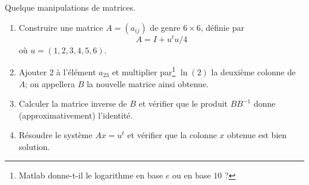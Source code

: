 \begin{exercice}\label{exoSC_serie1-0003}

	Quelque manipulations de matrices.

	\begin{enumerate}

		\item			
			Construire une matrice $A=(a_{ij})$ de genre $6\times 6$, définie par
			\begin{equation}
				A=I+u^tu/4
			\end{equation}
			où $u=(1,2,3,4,5,6)$.
		\item
			Ajouter $2$ à l'élément $a_{23}$ et multiplier par\footnote{Matlab donne-t-il le logarithme en base $e$ ou en base $10$ ?} $\ln(2)$ la deuxième colonne de $A$; on appellera $B$ la nouvelle matrice ainsi obtenue.
		\item
			Calculer la matrice inverse de $B$ et vérifier que le produit $BB^{-1}$ donne (approximativement) l'identité.
		\item
			Résoudre le système $Ax=u^t$ et vérifier que la colonne $x$ obtenue est bien solution.
	\end{enumerate}
	

\end{exercice}
